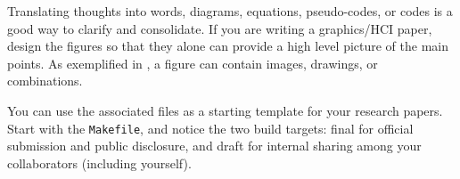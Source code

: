 


Translating thoughts into words, diagrams, equations, pseudo-codes, or codes is a good way to clarify and consolidate.
If you are writing a graphics/HCI paper, design the figures so that they alone can provide a high level picture of the main points.
As exemplified in , a figure can contain images, drawings, or combinations. 


You can use the associated files as a starting template for your research papers.
Start with the \texttt{Makefile}, and notice the two build targets: final for official submission and public disclosure, and draft for internal sharing among your collaborators (including yourself).
